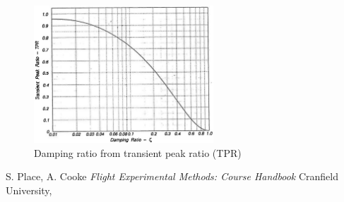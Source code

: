 \documentclass{article}
\begin{document}
\begin{figure}[H]
  \centering
  \includegraphics[width=0.6\textwidth]{figures/tpr_zeta.png}
  \caption{Damping ratio from transient peak ratio (TPR) \cite{?}}
  \label{fig:tpr_to_zeta}
\end{figure}

\begin{thebibliography}{9}

  S. Place, A. Cooke
  \emph{Flight Experimental Methods: Course Handbook}
  Cranfield University,

\end{thebibliography}
\end{document}
